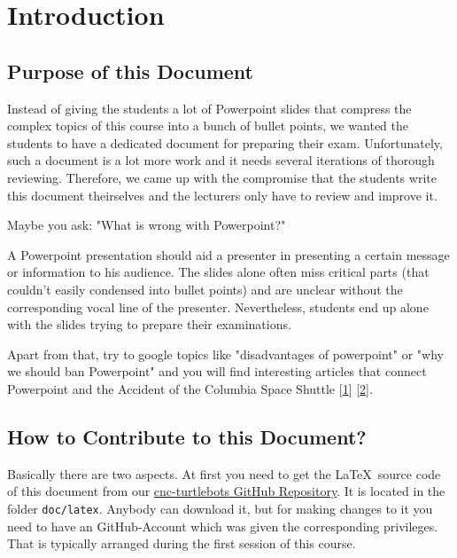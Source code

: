 \chapter{Introduction}
\label{chap:Introduction}

\section{Purpose of this Document}
\label{sec:Purpose}

Instead of giving the students a lot of Powerpoint slides that compress the complex topics of this course into a bunch of bullet points, we wanted the students to have a dedicated document for preparing their exam. Unfortunately, such a document is a lot more work and it needs several iterations of thorough reviewing. Therefore, we came up with the compromise that the students write this document theirselves and the lecturers only have to review and improve it. 

Maybe you ask: "What is wrong with Powerpoint?" 

A Powerpoint presentation should aid a presenter in presenting a certain message or information to his audience. The slides alone often miss critical parts (that couldn't easily condensed into bullet points) and are unclear without the corresponding vocal line of the presenter. Nevertheless, students end up alone with the slides trying to prepare their examinations.

Apart from that, try to google topics like "disadvantages of powerpoint" or "why we should ban Powerpoint" and you will find interesting articles that connect Powerpoint and the Accident of the Columbia Space Shuttle [\href{http://www.nytimes.com/2003/12/14/magazine/2003-the-3rd-annual-year-in-ideas-powerpoint-makes-you-dumb.html}{1}] [\href{http://www.edwardtufte.com/bboard/q-and-a-fetch-msg?msg_id=0001yB&topic_id=1&topic=Ask+E%2eT%2e}{2}].

\section{How to Contribute to this Document?}
\label{sec:Contribute}

Basically there are two aspects. At first you need to get the \LaTeX\  source code of this document from our \href{https://github.com/carpe-noctem-cassel/cnc-turtlebots}{cnc-turtlebots GitHub Repository}. It is located in the folder \verb#doc/latex#. Anybody can download it, but for making changes to it you need to have an GitHub-Account which was given the corresponding privileges. That is typically arranged during the first session of this course. 

